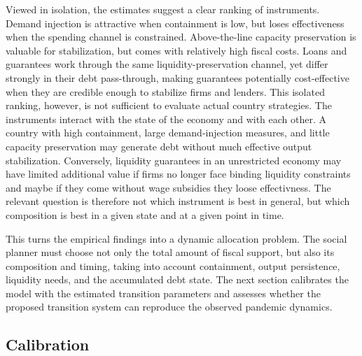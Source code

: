\documentclass[12pt, a4paper]{article}
\begin{document}
Viewed in isolation, the estimates suggest a clear ranking of instruments. Demand injection is attractive when containment is low, but loses effectiveness when the spending channel is constrained. Above-the-line capacity preservation is valuable for stabilization, but comes with relatively high fiscal costs. Loans and guarantees work through the same liquidity-preservation channel, yet differ strongly in their debt pass-through, making guarantees potentially cost-effective when they are credible enough to stabilize firms and lenders. This isolated ranking, however, is not sufficient to evaluate actual country strategies. The instruments interact with the state of the economy and with each other. A country with high containment, large demand-injection measures, and little capacity preservation may generate debt without much effective output stabilization. Conversely, liquidity guarantees in an unrestricted economy may have limited additional value if firms no longer face binding liquidity constraints and maybe if they come without wage subsidies they loose effectivness. The relevant question is therefore not which instrument is best in general, but which composition is best in a given state and at a given point in time.

This turns the empirical findings into a dynamic allocation problem. The social planner must choose not only the total amount of fiscal support, but also its composition and timing, taking into account containment, output persistence, liquidity needs, and the accumulated debt state. The next section calibrates the model with the estimated transition parameters and assesses whether the proposed transition system can reproduce the observed pandemic dynamics.




\subsection{Calibration}
\label{subsec:calibration}
\end{document}
